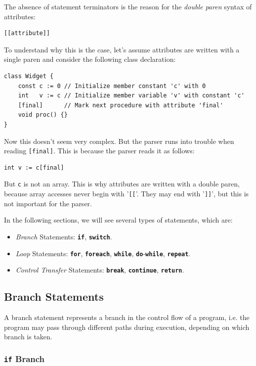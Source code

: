 \documentclass[a5paper]{report}
\begin{document}
The absence of statement terminators is the reason for the \textit{double paren} syntax of attributes:
\begin{lstlisting}
[[attribute]]
\end{lstlisting}
To understand why this is the case, let's assume attributes are written with a single paren and consider
the following class declaration:
\begin{lstlisting}
class Widget {
    const c := 0 // Initialize member constant 'c' with 0
    int   v := c // Initialize member variable 'v' with constant 'c'
    [final]      // Mark next procedure with attribute 'final'
    void proc() {}
}
\end{lstlisting}
Now this doesn't seem very complex. But the parser runs into trouble when reading \texttt{[final]}.
This is because the parser reads it as follows:
\begin{lstlisting}
int v := c[final]
\end{lstlisting}
But \texttt{c} is not an array. This is why attributes are written with a double paren, because array accesses
never begin with '\texttt{[[}'. They may end with '\texttt{]]}', but this is not important for the parser.

In the following sections, we will see several types of statements, which are:
\begin{itemize}
	\item \textit{Branch} Statements:
		\textbf{\texttt{if}}, \textbf{\texttt{switch}}.
	\item \textit{Loop} Statements:
		\textbf{\texttt{for}}, \textbf{\texttt{foreach}}, \textbf{\texttt{while}},
		\textbf{\texttt{do}}-\textbf{\texttt{while}}, \textbf{\texttt{repeat}}.
	\item \textit{Control Transfer} Statements:
		\textbf{\texttt{break}}, \textbf{\texttt{continue}}, \textbf{\texttt{return}}.
\end{itemize}

\subsection{Branch Statements}

A branch statement represents a branch in the control flow of a program, i.e. the program may pass through different
paths during execution, depending on which branch is taken.

\subsubsection{\texttt{if} Branch}
\end{document}
